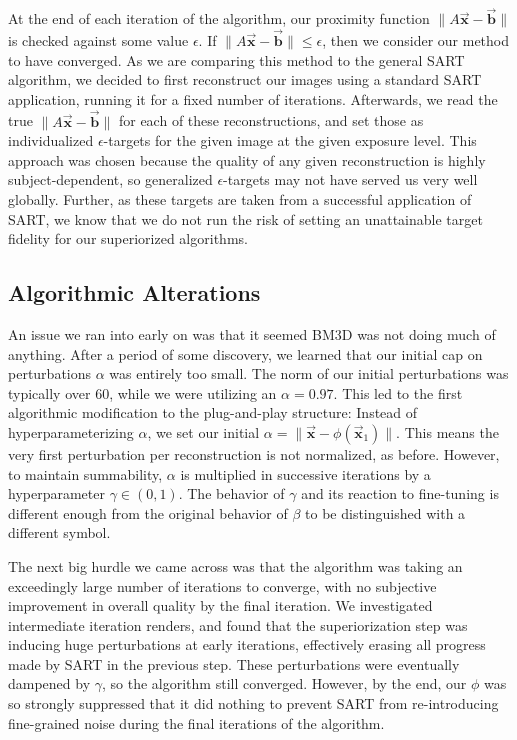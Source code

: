 \documentclass[sigconf,twocolumn,nonacm=true]{acmart}
\newcommand{\tighten}{\vspace*{-6pt plus -2pt minus -2pt}} %
\newcommand{\vvec}[1]{\vec{\boldsymbol{#1}}} %
\newcommand{\norm}[1]{\lVert #1 \rVert} %
\newcommand{\eps}{\epsilon} %
\begin{document}
At the end of each iteration of the algorithm, our proximity function $\norm{A\vvec{x}-\vvec{b}}$ is checked against some value $\eps$. If $\norm{A\vvec{x}-\vvec{b}}\leq\eps$, then we consider our method to have converged. As we are comparing this method to the general SART algorithm, we decided to first reconstruct our images using a standard SART application, running it for a fixed number of iterations. Afterwards, we read the true $\norm{A\vvec{x}-\vvec{b}}$ for each of these reconstructions, and set those as individualized $\eps$-targets for the given image at the given exposure level. This approach was chosen because the quality of any given reconstruction is highly subject-dependent, so generalized $\eps$-targets may not have served us very well globally. Further, as these targets are taken from a successful application of SART, we know that we do not run the risk of setting an unattainable target fidelity for our superiorized algorithms.

\subsection{Algorithmic Alterations}\tighten
An issue we ran into early on was that it seemed BM3D was not doing much of anything. After a period of some discovery, we learned that our initial cap on perturbations $\alpha$ was entirely too small. The norm of our initial perturbations was typically over 60, while we were utilizing an $\alpha=0.97$. This led to the first algorithmic modification to the plug-and-play structure: Instead of hyperparameterizing $\alpha$, we set our initial $\alpha = \norm{\vvec{x}-\phi(\vvec{x}_1)}$. This means the very first perturbation per reconstruction is not normalized, as before. However, to maintain summability, $\alpha$ is multiplied in successive iterations by a hyperparameter $\gamma\in(0,1)$. The behavior of $\gamma$ and its reaction to fine-tuning is different enough from the original behavior of $\beta$ to be distinguished with a different symbol.

The next big hurdle we came across was that the algorithm was taking an exceedingly large number of iterations to converge, with no subjective improvement in overall quality by the final iteration. We investigated intermediate iteration renders, and found that the superiorization step was inducing huge perturbations at early iterations, effectively erasing all progress made by SART in the previous step. These perturbations were eventually dampened by $\gamma$, so the algorithm still converged. However, by the end, our $\phi$ was so strongly suppressed that it did nothing to prevent SART from re-introducing fine-grained noise during the final iterations of the algorithm. 
\end{document}
